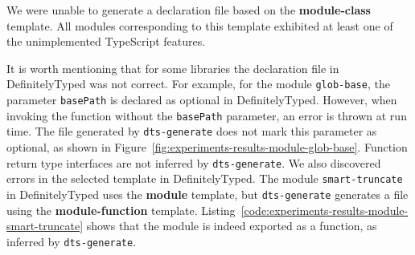 \documentclass[english,cleveref,autoref,submission]{programming}
\newcommand{\figref}[1]{Figure~\ref{#1}}
\newcommand{\coderef}[1]{Listing~\ref{#1}}
\begin{document}
We were unable to  generate a declaration file based on the
\textbf{module-class} template. All modules corresponding to this template exhibited at least one of
the unimplemented TypeScript features. 

It is worth mentioning that for some libraries the declaration file in DefinitelyTyped was
not correct. For example, for the module \texttt{glob-base}, the parameter
\texttt{basePath} is declared as optional in DefinitelyTyped. However, when invoking the
function without the \texttt{basePath} parameter, an error is thrown at run time. The file generated by
\texttt{dts-generate} does not mark this parameter as optional, as shown in
\figref{fig:experiments-results-module-glob-base}. Function return type interfaces are
not inferred by \texttt{dts-generate}.
We also
discovered errors in the selected template in DefinitelyTyped. The module
\texttt{smart-truncate} in DefinitelyTyped uses the \textbf{module} template, but
\texttt{dts-generate} generates a file using the \textbf{module-function}
template. \coderef{code:experiments-results-module-smart-truncate} shows that the module is indeed
exported as a function, as inferred by \texttt{dts-generate}.
\end{document}
